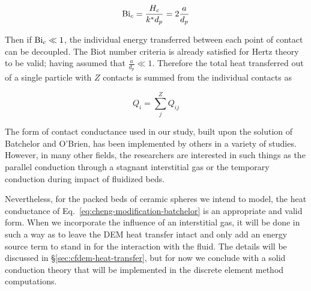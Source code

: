 \begin{equation}
	\mathrm{Bi}_c = \frac{H_c}{k^* d_p} = 2\frac{a}{d_p}
\end{equation}

Then if $\mathrm{Bi}_c \ll 1$, the individual energy transferred between each point of contact can be decoupled. The Biot number criteria is already satisfied for Hertz theory to be valid; having assumed that $\frac{a}{d_p} \ll 1$. Therefore the total heat transferred out of a single particle with $Z$ contacts is summed from the individual contacts as 

\begin{equation}
	Q_i = \sum_j^Z Q_{ij}
\end{equation}

The form of contact conductance used in our study, built upon the solution of Batchelor and O'Brien\cite{Batchelor1977}, has been implemented by others in a variety of studies\cite{Vargas2001, Chaudhuri2006, Zhou2009,Cheng19994199}. However, in many other fields, the researchers are interested in such things as the parallel conduction through a stagnant interstitial gas\cite{Bu2013} or the temporary conduction during impact of fluidized beds\cite{Zhu2008,Zhang2011,Wu2011,Li2000}.

Nevertheless, for the packed beds of ceramic spheres we intend to model, the heat conductance of Eq.~\ref{eq:cheng-modification-batchelor} is an appropriate and valid form. When we incorporate the influence of an interstitial gas, it will be done in such a way as to leave the DEM heat transfer intact and only add an energy source term to stand in for the interaction with the fluid. The details will be discussed in \S\ref{sec:cfdem-heat-transfer}, but for now we conclude with a solid conduction theory that will be implemented in the discrete element method computations.